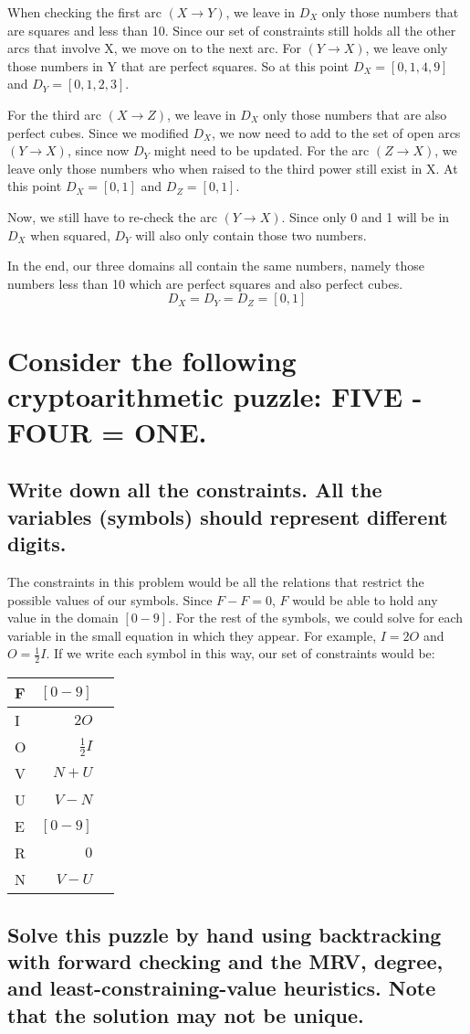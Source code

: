 \documentclass{article}
\begin{document}
	When checking the first arc $(X\rightarrow Y)$, we leave in $D_{X}$ only those numbers that are squares and
	less than 10. Since our set of constraints still holds all the other arcs that involve X, we move on to the 
	next arc. For $(Y\rightarrow X)$, we leave only those numbers in Y that are perfect squares. So at this 
	point $D_{X}=[0,1,4,9]$ and $D_{Y}=[0,1,2,3]$. 

	For the third arc $(X\rightarrow Z)$, we leave in $D_{X}$ only those numbers that are also perfect cubes. 
	Since we modified $D_{X}$, we now need to add to the set of open arcs $(Y\rightarrow X)$, since now $D_{Y}$
	might need to be updated. For the arc $(Z\rightarrow X)$, we leave only those numbers who when raised 
	to the third power still exist in X. At this point $D_{X}=[0,1]$ and $D_{Z}=[0,1]$. 

	Now, we still have to re-check the arc $(Y\rightarrow X)$. Since only 0 and 1 will be in $D_{X}$ when 
	squared, $D_{Y}$ will also only contain those two numbers. 

	In the end, our three domains all contain the same numbers, namely those numbers less than 10 which are 
	perfect squares and also perfect cubes. 
	\[ D_{X} = D_{Y} = D_{Z} = [0,1]\]

\section{Consider the following cryptoarithmetic puzzle: FIVE - FOUR = ONE.}
	\subsection{Write down all the constraints. All the variables (symbols) should represent different digits.}
	The constraints in this problem would be all the relations that restrict the possible values of our symbols.
	Since $F - F = 0$, $F$ would be able to hold any value in the domain $[0-9]$. For the rest of the symbols,
	we could solve for each variable in the small equation in which they appear. For example, $I= 2O$ and 
	$O = \frac{1}{2}I$. If we write each symbol in this way, our set of constraints would be:
	\begin{center}
		\begin{tabular}{|l | r | c |}
			\hline
				F  & $[0-9]$ \\ \hline
				I  & $2O$\\ \hline
				O  & $\frac{1}{2}I$\\ \hline
				V  & $N + U$\\ \hline
				U  & $V - N$\\ \hline
				E  & $[0-9]$\\ \hline
				R  & $0$ \\ \hline
				N  & $V - U$\\ 
			\hline
		\end{tabular}	
	\end{center}
	\subsection{Solve this puzzle by hand using backtracking with forward checking and the MRV, degree, and 
	least-constraining-value heuristics. Note that the solution may not be unique.}
\end{document}

